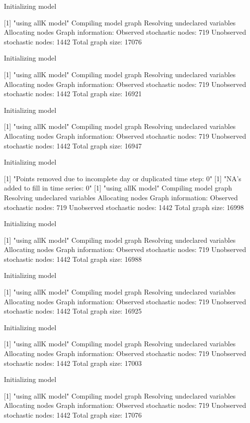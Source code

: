 \documentclass[11pt,lineno]{manuscript}\usepackage[]{graphicx}\usepackage[]{xcolor}
\begin{document}
Initializing model

[1] "using allK model"
Compiling model graph
   Resolving undeclared variables
   Allocating nodes
Graph information:
   Observed stochastic nodes: 719
   Unobserved stochastic nodes: 1442
   Total graph size: 17076

Initializing model

[1] "using allK model"
Compiling model graph
   Resolving undeclared variables
   Allocating nodes
Graph information:
   Observed stochastic nodes: 719
   Unobserved stochastic nodes: 1442
   Total graph size: 16921

Initializing model

[1] "using allK model"
Compiling model graph
   Resolving undeclared variables
   Allocating nodes
Graph information:
   Observed stochastic nodes: 719
   Unobserved stochastic nodes: 1442
   Total graph size: 16947

Initializing model

[1] "Points removed due to incomplete day or duplicated time step: 0"
[1] "NA's added to fill in time series: 0"
[1] "using allK model"
Compiling model graph
   Resolving undeclared variables
   Allocating nodes
Graph information:
   Observed stochastic nodes: 719
   Unobserved stochastic nodes: 1442
   Total graph size: 16998

Initializing model

[1] "using allK model"
Compiling model graph
   Resolving undeclared variables
   Allocating nodes
Graph information:
   Observed stochastic nodes: 719
   Unobserved stochastic nodes: 1442
   Total graph size: 16988

Initializing model

[1] "using allK model"
Compiling model graph
   Resolving undeclared variables
   Allocating nodes
Graph information:
   Observed stochastic nodes: 719
   Unobserved stochastic nodes: 1442
   Total graph size: 16925

Initializing model

[1] "using allK model"
Compiling model graph
   Resolving undeclared variables
   Allocating nodes
Graph information:
   Observed stochastic nodes: 719
   Unobserved stochastic nodes: 1442
   Total graph size: 17003

Initializing model

[1] "using allK model"
Compiling model graph
   Resolving undeclared variables
   Allocating nodes
Graph information:
   Observed stochastic nodes: 719
   Unobserved stochastic nodes: 1442
   Total graph size: 17076
\end{document}
